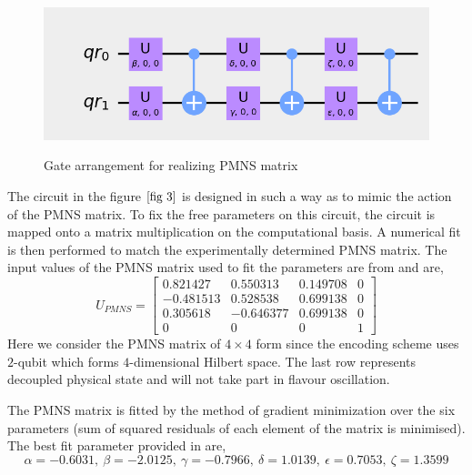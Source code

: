 \documentclass[12pt,a4paper]{report}
\begin{document}
\begin{figure}[h]
\graphicspath{ {./Images/} }
\centering	
{\includegraphics[scale=1]{fig_3.png}}
\caption{Gate arrangement for realizing PMNS matrix\cite{jones}}
\label{fig 3}
\end{figure}

The circuit in the figure $\ref{fig 3}$ is designed in such a way as to mimic the action of the PMNS matrix. To fix the free parameters on this circuit, the circuit is mapped onto a matrix multiplication on the computational basis. A numerical fit is then performed to match the experimentally determined PMNS matrix. The input values of the PMNS matrix used to fit the parameters are from \cite{estaban} and are,
\begin{equation}
U_{PMNS} = \begin{bmatrix} 0.821427 & 0.550313 & 0.149708 & 0 \\ -0.481513&0.528538&0.699138&0\\0.305618&-0.646377&0.699138&0\\0&0&0&1 \end{bmatrix}
\end{equation}
Here we consider the PMNS matrix of $4\times4$ form since the encoding scheme uses $2$-qubit which forms $4$-dimensional Hilbert space.  The last row represents decoupled physical state and will not take part in flavour oscillation. \par
The PMNS matrix is fitted by the method of gradient minimization over the six parameters (sum of squared residuals of each element of the matrix is minimised). The best fit parameter provided in \cite{jones} are, 
\begin{equation}
\label{eq:18}
\alpha = -0.6031,\ \beta = -2.0125, \ \gamma = -0.7966, \ \delta = 1.0139 ,\  \epsilon = 0.7053, \ \zeta = 1.3599
\end{equation}
\end{document}
